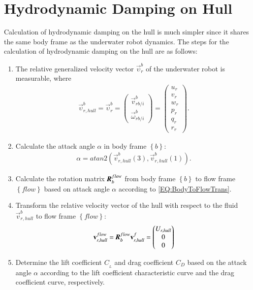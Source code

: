 \section{Hydrodynamic Damping on Hull}
Calculation of hydrodynamic damping on the hull is much simpler since it shares the same body frame as the underwater robot dynamics. The steps for the calculation of hydrodynamic damping on the hull are as follows:
\begin{enumerate}
\item The relative generalized velocity vector $\vec{\upsilon}_{r}^{b}$ of the underwater robot is measurable,
where 
\begin{align}
\vec{\upsilon}_{r,hull}^{b}=\vec{\upsilon}_{r}^{b}=\begin{pmatrix}
\vec{v}^{b}_{rb/i} \\
\vec{\omega}^{b}_{rb/i}
\end{pmatrix}=
\begin{pmatrix}
u_{r}\\v_{r}\\w_{r}\\p_{r}\\q_{r}\\r_{r}
\end{pmatrix}.
\end{align}
\item Calculate the attack angle $\alpha$ in body frame $\left\{ b \right\}$:
\begin{align}
\alpha=atan2(\vec{v}_{r,hull}^{b}(3),\vec{v}_{r,hull}^{b}(1)).
\end{align}
\item Calculate the rotation matrix $\emph{\textbf{R}}^{flow}_{b}$ from body frame $\left\{ b \right\}$ to flow frame $\left\{ flow \right\}$ based on attack angle $\alpha$ according to \ref{EQ:BodyToFlowTrans}.
\item Transform the relative velocity vector of the hull with respect to the fluid $\vec{v}_{r,hull}^{b}$ to flow frame $\left\{ flow \right\}$:
\begin{align}
\vec{v}_{r,hull}^{flow}=\emph{\textbf{R}}^{flow}_{b}\vec{v}_{r,hull}^{f}=\begin{pmatrix}
U_{r,hull}\\0\\0
\end{pmatrix}
\end{align}
\item Determine the lift coefficient $C_{_{L}}$ and drag coefficient $C_{D}$ based on the attack angle $\alpha$ according to the lift coefficient characteristic curve and the drag coefficient curve, respectively.

\end{enumerate}
